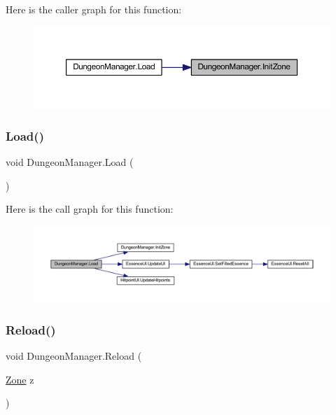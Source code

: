 Here is the caller graph for this function\+:
\nopagebreak
\begin{figure}[H]
\begin{center}
\leavevmode
\includegraphics[width=350pt]{class_dungeon_manager_afc7ff9dc122b876f72a4f238496f3a26_icgraph}
\end{center}
\end{figure}
\mbox{\label{class_dungeon_manager_ac2c0ce668813e7b0a34b935364a5650f}} 
\subsubsection{\texorpdfstring{Load()}{Load()}}
{\footnotesize\ttfamily void Dungeon\+Manager.\+Load (\begin{DoxyParamCaption}{ }\end{DoxyParamCaption})}

Here is the call graph for this function\+:
\nopagebreak
\begin{figure}[H]
\begin{center}
\leavevmode
\includegraphics[width=350pt]{class_dungeon_manager_ac2c0ce668813e7b0a34b935364a5650f_cgraph}
\end{center}
\end{figure}
\mbox{\label{class_dungeon_manager_af5da9360e25192d468c5e8461ff19f20}} 
\subsubsection{\texorpdfstring{Reload()}{Reload()}}
{\footnotesize\ttfamily void Dungeon\+Manager.\+Reload (\begin{DoxyParamCaption}\item[{\mbox{\hyperlink{class_dungeon_manager_a6558d4a01889674bf25c798f1b90a431}{Zone}}}]{z }\end{DoxyParamCaption})}

